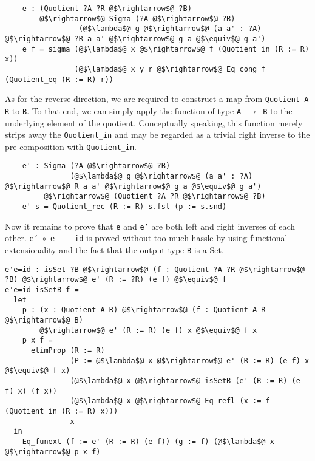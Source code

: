 \documentclass[12pt,twoside,maitrise]{dms}
\theoremstyle{definition}
\numberwithin{equation}{section}
\numberwithin{table}{chapter}
\numberwithin{figure}{chapter}
\newcommand\id[1] {\texttt{#1}}
\newcommand\fn[1] {\texttt{#1}}
\begin{document}
\begin{verbatim}
    e : (Quotient ?A ?R @$\rightarrow$@ ?B)
        @$\rightarrow$@ Sigma (?A @$\rightarrow$@ ?B)
                 (@$\lambda$@ g @$\rightarrow$@ (a a' : ?A) @$\rightarrow$@ ?R a a' @$\rightarrow$@ g a @$\equiv$@ g a')
    e f = sigma (@$\lambda$@ x @$\rightarrow$@ f (Quotient_in (R := R) x))
                (@$\lambda$@ x y r @$\rightarrow$@ Eq_cong f (Quotient_eq (R := R) r))
\end{verbatim}

As for the reverse direction, we are required to construct a map from
\fn{Quotient A R} to \id{B}. To that end, we can simply apply the function of
type \fn{A $\rightarrow$ B} to the underlying element of the quotient.
Conceptually speaking, this function merely strips away the \id{Quotient\_in}
and may be regarded as a trivial right inverse to the pre-composition with
\id{Quotient\_in}.

\begin{verbatim}
    e' : Sigma (?A @$\rightarrow$@ ?B)
               (@$\lambda$@ g @$\rightarrow$@ (a a' : ?A) @$\rightarrow$@ R a a' @$\rightarrow$@ g a @$\equiv$@ g a')
         @$\rightarrow$@ (Quotient ?A ?R @$\rightarrow$@ ?B)
    e' s = Quotient_rec (R := R) s.fst (p := s.snd)
\end{verbatim}

Now it remains to prove that \id{e} and \id{e'} are both left and right inverses
of each other. \fn{e' $\circ{}$ e $\equiv$ id} is proved without too much hassle
by using functional extensionality and the fact that the output type \id{B} is a
Set.

\begin{verbatim}
e'e=id : isSet ?B @$\rightarrow$@ (f : Quotient ?A ?R @$\rightarrow$@ ?B) @$\rightarrow$@ e' (R := ?R) (e f) @$\equiv$@ f
e'e=id isSetB f =
  let
    p : (x : Quotient A R) @$\rightarrow$@ (f : Quotient A R @$\rightarrow$@ B)
        @$\rightarrow$@ e' (R := R) (e f) x @$\equiv$@ f x
    p x f =
      elimProp (R := R)
               (P := @$\lambda$@ x @$\rightarrow$@ e' (R := R) (e f) x @$\equiv$@ f x)
               (@$\lambda$@ x @$\rightarrow$@ isSetB (e' (R := R) (e f) x) (f x))
               (@$\lambda$@ x @$\rightarrow$@ Eq_refl (x := f (Quotient_in (R := R) x)))
               x
  in
    Eq_funext (f := e' (R := R) (e f)) (g := f) (@$\lambda$@ x @$\rightarrow$@ p x f)
\end{verbatim}
\end{document}
